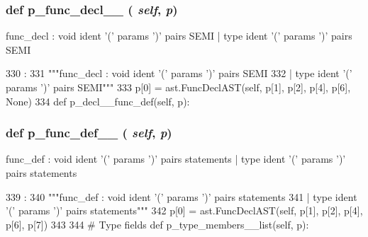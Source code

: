 \begin{DoxyVerb}
{\subsubsection[{p\_\-func\_\-decl\_\-\_\-0}]{\setlength{\rightskip}{0pt plus 5cm}def p\_\-func\_\-decl\_\-\_ ( {\em self}, \/   {\em p})}}
\label{classslicc_1_1parser_1_1SLICC_afaf6fd2752bcbcfe7e4b38de1c128c99}
\begin{DoxyVerb}func_decl :  void ident '(' params ')' pairs SEMI
| type ident '(' params ')' pairs SEMI\end{DoxyVerb}
 


\begin{DoxyCode}
330                                :
331         """func_decl :  void ident '(' params ')' pairs SEMI
332                 | type ident '(' params ')' pairs SEMI"""
333         p[0] = ast.FuncDeclAST(self, p[1], p[2], p[4], p[6], None)
334 
    def p_decl__func_def(self, p):
\end{DoxyCode}
\hypertarget{classslicc_1_1parser_1_1SLICC_a6b32df3ee60a0582f8efd9aa32d5ab60}{
\subsubsection[{p\_\-func\_\-def\_\-\_\-0}]{\setlength{\rightskip}{0pt plus 5cm}def p\_\-func\_\-def\_\-\_ ( {\em self}, \/   {\em p})}}
\label{classslicc_1_1parser_1_1SLICC_a6b32df3ee60a0582f8efd9aa32d5ab60}
\begin{DoxyVerb}func_def : void ident '(' params ')' pairs statements
    | type ident '(' params ')' pairs statements\end{DoxyVerb}
 


\begin{DoxyCode}
339                               :
340         """func_def : void ident '(' params ')' pairs statements
341             | type ident '(' params ')' pairs statements"""
342         p[0] = ast.FuncDeclAST(self, p[1], p[2], p[4], p[6], p[7])
343 
344     # Type fields
    def p_type_members__list(self, p):
\end{DoxyCode}
\hypertarget{classslicc_1_1parser_1_1SLICC_ac6953139e7912e8b74f9cc2ebe2befd7}{
}
\end{DoxyVerb}
